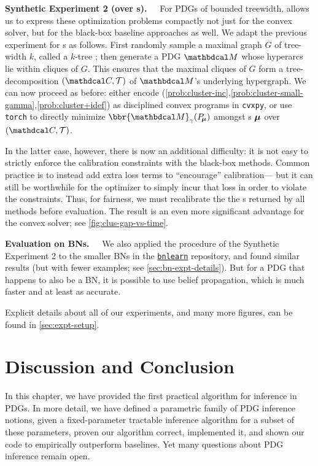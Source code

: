 \textbf{Synthetic Experiment 2 ({\normalfont over \actree s}).~~} 
For PDGs of bounded treewidth,  allows us to express these optimization problems compactly not just for the convex solver, but for the black-box baseline approaches as well.
We adapt the previous experiment for \actree s as follows.
First randomly sample a maximal graph $G$ of tree-width $k$, called a 
    $k$-tree \parencite{patil1986structure}; 
then generate a PDG $\dg M$ whose hyperarcs lie within cliques of $G$.
This ensures that the maximal cliques of $G$ form a tree-decomposition $(\C, \mathcal T)$ of $\dg M$'s underlying
    hypergraph.
We can now proceed as before: 
    either encode
    (\ref{prob:cluster-inc},\ref{prob:cluster-small-gamma},\ref{prob:cluster+idef})
    as disciplined convex programs in \verb|cvxpy|,
or use \verb|torch| to directly minimize $\bbr{\dg M}_\gamma(\Pr_{\!\bmu})$
    amongst \actree s $\boldsymbol\mu$ over $(\C, \mathcal T)$.
    

In the latter case, however, there is now an additional difficulty:
    it is not easy to strictly enforce the calibration constraints with the black-box methods.
Common practice is to instead add extra loss terms to ``encourage'' calibration---%
but
    it can still be worthwhile for the optimizer to simply incur that loss 
    in order to violate the constraints.
Thus, for fairness, we must recalibrate the 
    the \actree s returned by all methods before evaluation.
The result is an even more significant advantage for the convex solver; 
see \cref{fig:clus-gap-vs-time}.

\textbf{Evaluation on BNs.~~}
We also applied the procedure of the Synthetic Experiment 2
to the smaller BNs in the
\href{https://www.bnlearn.com/bnrepository/}{\texttt{bnlearn}} repository,
and found similar results (but with fewer examples; see \cref{sec:bn-expt-details}). 
But for a PDG that happens to also be a BN, it is possible to use belief propagation, which is much faster and at least as accurate.

Explicit details about all of our experiments, 
and many more figures, can be found in \cref{sec:expt-setup}.

\section{Discussion and Conclusion}

In this chapter, we have provided the first practical algorithm for
    inference in PDGs. 
In more detail, we have defined a parametric family of PDG inference notions, 
given a fixed-parameter tractable inference algorithm for a subset of these parameters,
    proven our algorithm correct, implemented it, and
    shown our code to empirically outperform baselines.
Yet many questions about PDG inference remain open.

